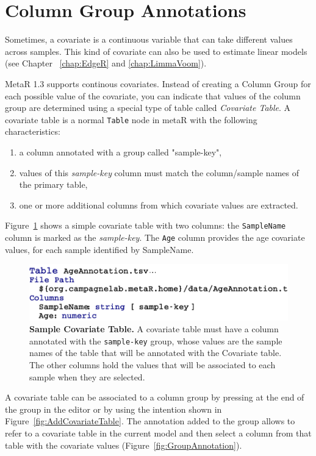 \section{Column Group Annotations}\label{sec:ColumnGroupAnnotations}
Sometimes, a covariate is a continuous variable that can take  different values across samples. This kind of covariate can also be used to estimate  linear models (see Chapter ~\ref{chap:EdgeR} and \ref{chap:LimmaVoom}). 

MetaR 1.3 supports continous covariates. Instead of creating a Column Group for each possible value of the covariate, you can indicate that values of the column group are determined  using a special type of table called \textit{Covariate Table}.  A covariate table is a normal \texttt{Table} node in metaR with the following characteristics:
\begin{enumerate}
\item a column annotated with a group called "sample-key",
\item values of this \textit{sample-key} column must match the column/sample names of the primary table,
\item one or more additional columns from which covariate values are extracted. 
\end{enumerate}
Figure~\ref{fig:CovariateTable} shows a simple covariate table with two columns: the \texttt{SampleName} column is marked as the \textit{sample-key}. The \texttt{Age} column provides the age covariate values, for each sample identified by SampleName.
\begin{figure}[h!tbp]
  \centering
  \includegraphics[width=\figWidthWide]{figures/CovariateTable.pdf}
\caption[Covariate Table]{\textbf{Sample Covariate Table.} A covariate table must have a column annotated with the \texttt{sample-key} group, whose values are the sample names of the table that will be annotated with the Covariate table. The other columns hold the values that will be associated to each sample when they are selected.}
\label{fig:CovariateTable}
\end{figure}

A covariate table can be associated to a column group by pressing \keys{\lbrack} at the end of the group in the editor or by using the intention shown in Figure~\ref{fig:AddCovariateTable}.  The annotation added to the group allows to refer to a covariate table in the current model and then select a column from that table with the covariate values (Figure~\ref{fig:GroupAnnotation}).

